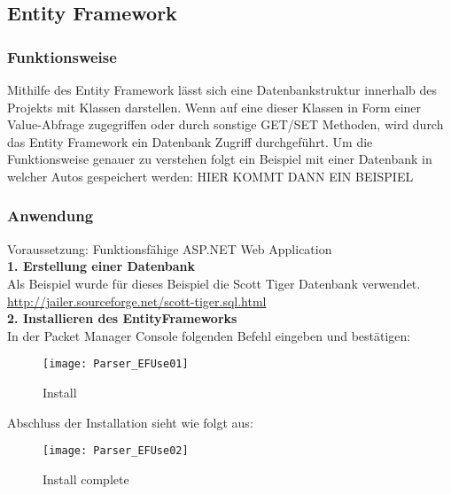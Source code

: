 \subsection{Entity Framework}
\label{sec:parser-entity-framework}
\subsubsection {Funktionsweise}
Mithilfe des Entity Framework lässt sich eine Datenbankstruktur innerhalb des Projekts mit Klassen darstellen. Wenn auf eine dieser Klassen in Form einer Value-Abfrage zugegriffen oder durch sonstige GET/SET Methoden, wird durch das Entity Framework ein Datenbank Zugriff durchgeführt. 
Um die Funktionsweise genauer zu verstehen folgt ein Beispiel mit einer Datenbank in welcher Autos gespeichert werden:
HIER KOMMT DANN EIN BEISPIEL
\subsubsection {Anwendung}
Voraussetzung: Funktionsfähige ASP.NET Web Application \\
\break \textbf{1. Erstellung einer Datenbank} \\
Als Beispiel wurde für dieses Beispiel die Scott Tiger Datenbank verwendet.
\break \url{http://jailer.sourceforge.net/scott-tiger.sql.html} \\
\break \textbf{2. Installieren des EntityFrameworks} \\
In der Packet Manager Console folgenden Befehl eingeben und bestätigen: 
\begin{figure}[H]
	\centering
    \texttt{[image: Parser\_EFUse01]}
    \caption{Install}
    \label{fig:parsef01}
\end{figure}
Abschluss der Installation sieht wie folgt aus:
\begin{figure}[H]
    \texttt{[image: Parser\_EFUse02]}
    \caption{Install complete}
    \label{fig:parsef02}
\end{figure} 

